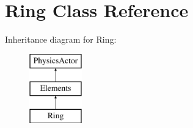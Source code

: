 \hypertarget{class_ring}{\section{Ring Class Reference}
\label{class_ring}
}
Inheritance diagram for Ring\+:\begin{figure}[H]
\begin{center}
\leavevmode
\includegraphics[height=3.000000cm]{class_ring}
\end{center}
\end{figure}
